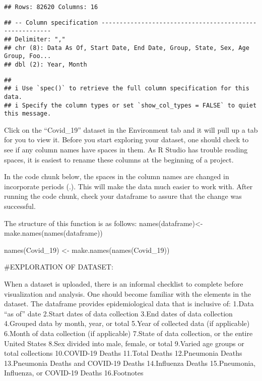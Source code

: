 \documentclass[
]{article}
\newenvironment{Shaded}{\begin{snugshade}}{\end{snugshade}}
\newcommand{\FunctionTok}[1]{\textcolor[rgb]{0.00,0.00,0.00}{#1}}
\newcommand{\NormalTok}[1]{#1}
\newcommand{\OtherTok}[1]{\textcolor[rgb]{0.56,0.35,0.01}{#1}}
\begin{document}
\begin{verbatim}
## Rows: 82620 Columns: 16
\end{verbatim}

\begin{verbatim}
## -- Column specification --------------------------------------------------------
## Delimiter: ","
## chr (8): Data As Of, Start Date, End Date, Group, State, Sex, Age Group, Foo...
## dbl (2): Year, Month
\end{verbatim}

\begin{verbatim}
## 
## i Use `spec()` to retrieve the full column specification for this data.
## i Specify the column types or set `show_col_types = FALSE` to quiet this message.
\end{verbatim}

Click on the ``Covid\_19'' dataset in the Environment tab and it will
pull up a tab for you to view it. Before you start exploring your
dataset, one should check to see if any column names have spaces in
them. As R Studio has trouble reading spaces, it is easiest to rename
these columns at the beginning of a project.

In the code chunk below, the spaces in the column names are changed in
incorporate periods (.). This will make the data much easier to work
with. After running the code chunk, check your dataframe to assure that
the change was successful.

The structure of this function is as follows:
names(dataframe)\textless-make.names(names(dataframe))

\begin{Shaded}
\begin{Highlighting}[]
\FunctionTok{names}\NormalTok{(Covid\_19) }\OtherTok{\textless{}{-}} \FunctionTok{make.names}\NormalTok{(}\FunctionTok{names}\NormalTok{(Covid\_19))}
\end{Highlighting}
\end{Shaded}

\#EXPLORATION OF DATASET:

When a dataset is uploaded, there is an informal checklist to complete
before visualization and analysis. One should become familiar with the
elements in the dataset. The dataframe provides epidemiological data
that is inclusive of: 1.Data ``as of'' date 2.Start dates of data
collection 3.End dates of data collection 4.Grouped data by month, year,
or total 5.Year of collected data (if applicable) 6.Month of data
collection (if applicable) 7.State of data collection, or the entire
United States 8.Sex divided into male, female, or total 9.Varied age
groups or total collections 10.COVID-19 Deaths 11.Total Deaths
12.Pneumonia Deaths 13.Pneumonia Deaths and COVID-19 Deaths 14.Influenza
Deaths 15.Pneumonia, Influenza, or COVID-19 Deaths 16.Footnotes
\end{document}
